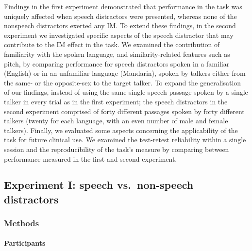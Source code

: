 \documentclass[a4paper, twoside]{templates/ociamthesis}
\begin{document}
Findings in the first experiment demonstrated that performance in the task was uniquely affected when speech distractors were presented, whereas none of the nonspeech distractors exerted any IM. To extend these findings, in the second experiment we investigated specific aspects of the speech distractor that may contribute to the IM effect in the task. We examined the contribution of familiarity with the spoken language, and similarity-related features such as pitch, by comparing performance for speech distractors spoken in a familiar (English) or in an unfamiliar language (Mandarin), spoken by talkers either from the same- or the opposite-sex to the target talker. To expand the generalisation of our findings, instead of using the same single speech passage spoken by a single talker in every trial as in the first experiment; the speech distractors in the second experiment comprised of forty different passages spoken by forty different talkers (twenty for each language, with an even number of male and female talkers). Finally, we evaluated some aspects concerning the applicability of the task for future clinical use. We examined the test-retest reliability within a single session and the reproducibility of the task's measure by comparing between performance measured in the first and second experiment.

\hypertarget{Exp1}{%
\subsection{Experiment I: speech vs.~non-speech distractors}\label{Exp1}}

\hfill\break

\hypertarget{methods}{%
\subsubsection{Methods}\label{methods}}

\hypertarget{participants}{%
\paragraph{Participants}\label{participants}}
\end{document}
